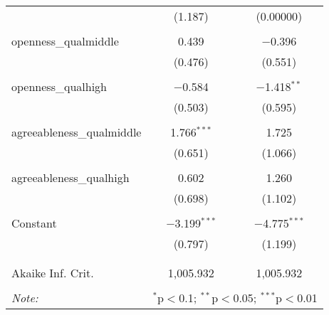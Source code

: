 \documentclass[]{article}
\begin{document}
\begin{table}[!htbp]
\begin{tabular}{@{\extracolsep{5pt}}lcc}
		& (1.187) & (0.00000) \\ 
		& & \\ 
		openness\_qualmiddle & 0.439 & $-$0.396 \\ 
		& (0.476) & (0.551) \\ 
		& & \\ 
		openness\_qualhigh & $-$0.584 & $-$1.418$^{**}$ \\ 
		& (0.503) & (0.595) \\ 
		& & \\ 
		agreeableness\_qualmiddle & 1.766$^{***}$ & 1.725 \\ 
		& (0.651) & (1.066) \\ 
		& & \\ 
		agreeableness\_qualhigh & 0.602 & 1.260 \\ 
		& (0.698) & (1.102) \\ 
		& & \\ 
		Constant & $-$3.199$^{***}$ & $-$4.775$^{***}$ \\ 
		& (0.797) & (1.199) \\ 
		& & \\ 
		\hline \\[-1.8ex] 
		Akaike Inf. Crit. & 1,005.932 & 1,005.932 \\ 
		\hline 
		\hline \\[-1.8ex] 
		\textit{Note:}  & \multicolumn{2}{r}{$^{*}$p$<$0.1; $^{**}$p$<$0.05; $^{***}$p$<$0.01} \\ 
	\end{tabular} 
\end{table} 
	
\end{document}
